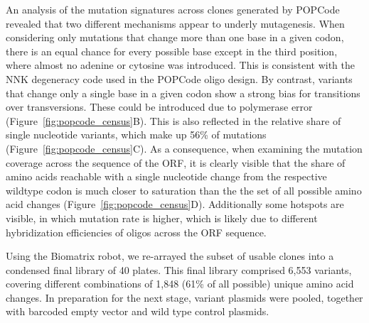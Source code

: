 An analysis of the mutation signatures across clones generated by POPCode revealed that two different mechanisms appear to underly mutagenesis. When considering only mutations that change more than one base in a given codon, there is an equal chance for every possible base except in the third position, where almost no adenine or cytosine was introduced. This is consistent with the NNK degeneracy code used in the POPCode oligo design. By contrast, variants that change only a single base in a given codon show a strong bias for transitions over transversions. These could be introduced due to polymerase error (Figure~\ref{fig:popcode_census}B). This is also reflected in the relative share of single nucleotide variants, which make up 56\% of mutations (Figure~\ref{fig:popcode_census}C). As a consequence, when examining the mutation coverage across the sequence of the ORF, it is clearly visible that the share of amino acids reachable with a single nucleotide change from the respective wildtype codon is much closer to saturation than the the set of all possible amino acid changes (Figure~\ref{fig:popcode_census}D). Additionally some hotspots are visible, in which mutation rate is higher, which is likely due to different hybridization efficiencies of oligos across the ORF sequence.

Using the Biomatrix robot, we re-arrayed the subset of usable clones into a condensed final library of 40 plates. This final library comprised 6,553  variants, covering different combinations of 1,848 (61\% of all possible) unique amino acid changes. In preparation for the next stage, variant plasmids were pooled, together with barcoded empty vector and wild type control plasmids.

